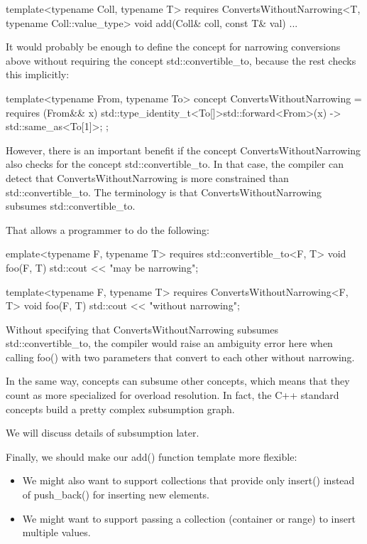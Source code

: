 \begin{cpp}
template<typename Coll, typename T>
requires ConvertsWithoutNarrowing<T, typename Coll::value_type>
void add(Coll& coll, const T& val)
{
	...
}
\end{cpp}


It would probably be enough to define the concept for narrowing conversions above without requiring the concept std::convertible\_to, because the rest checks this implicitly:

\begin{cpp}
template<typename From, typename To>
concept ConvertsWithoutNarrowing = requires (From&& x) {
	{ std::type_identity_t<To[]>{std::forward<From>(x)} } -> std::same_as<To[1]>;
};
\end{cpp}

However, there is an important benefit if the concept ConvertsWithoutNarrowing also checks for the concept std::convertible\_to. In that case, the compiler can detect that ConvertsWithoutNarrowing is more constrained than std::convertible\_to. The terminology is that ConvertsWithoutNarrowing subsumes std::convertible\_to.

That allows a programmer to do the following:

\begin{cpp}
emplate<typename F, typename T>
requires std::convertible_to<F, T>
void foo(F, T)
{
	std::cout << "may be narrowing\n";
}

template<typename F, typename T>
requires ConvertsWithoutNarrowing<F, T>
void foo(F, T)
{
	std::cout << "without narrowing\n";
}
\end{cpp}

Without specifying that ConvertsWithoutNarrowing subsumes std::convertible\_to, the compiler would raise an ambiguity error here when calling foo() with two parameters that convert to each other without narrowing.

In the same way, concepts can subsume other concepts, which means that they count as more specialized for overload resolution. In fact, the C++ standard concepts build a pretty complex subsumption graph.

We will discuss details of subsumption later.


Finally, we should make our add() function template more flexible:

\begin{itemize}
\item
We might also want to support collections that provide only insert() instead of push\_back() for inserting new elements.

\item
We might want to support passing a collection (container or range) to insert multiple values.
\end{itemize}

